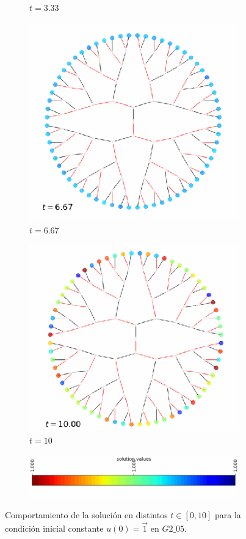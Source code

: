 \begin{figure}
\begin{subfigure}{.5\textwidth}
		\caption{$t=3.33$}
		\label{fig:sfig1}
	\end{subfigure}
	\begin{subfigure}{.5\textwidth}
		\centering
		\includegraphics[width=.8\linewidth]{img/solutions/ones_2}
		\caption{$t=6.67$}
		\label{fig:sfig1}
	\end{subfigure}%
	\begin{subfigure}{.5\textwidth}
		\centering
		\includegraphics[width=.8\linewidth]{img/solutions/ones_3}
		\caption{$t=10$}
		\label{fig:sfig1}
	\end{subfigure}
	\begin{subfigure}{1.05\textwidth}
		\centering
		\includegraphics[width=.8\linewidth]{img/solutions/ones_bar}
		\label{fig:sfig1}
	\end{subfigure}%
	\caption{Comportamiento de la solución en distintos $t\in[0,10]$ para la condición inicial constante $u(0)=\vec{1}$ en $\mathit{G2\_05}.$}
	\label{IC-const}
\end{figure}



